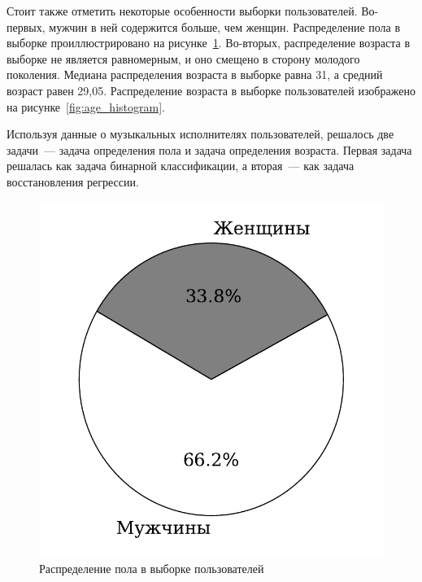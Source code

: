 Стоит также отметить некоторые особенности выборки пользователей.
Во-первых, мужчин в ней содержится больше, чем женщин. Распределение
пола в выборке проиллюстрировано на рисунке~\ref{fig:gender_pie}.
Во-вторых, распределение возраста в выборке не является равномерным,
и оно смещено в сторону молодого поколения. Медиана распределения
возраста в выборке равна 31, а средний возраст равен 29,05.
Распределение возраста в выборке пользователей изображено на
рисунке~\ref{fig:age_histogram}.

Используя данные о музыкальных исполнителях пользователей,
решалось две задачи~--- задача определения пола и задача
определения возраста. Первая задача решалась как задача
бинарной классификации, а вторая~--- как задача восстановления
регрессии.

\begin{figure}[!h]
\caption{Распределение пола в выборке пользователей}
\label{fig:gender_pie}
\centering
\includegraphics[scale=0.65]{figs/gender-pie.pdf}
\end{figure}

